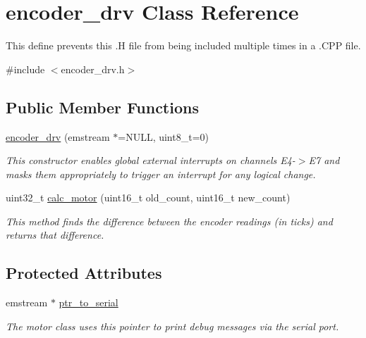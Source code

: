 \hypertarget{classencoder__drv}{\section{encoder\-\_\-drv Class Reference}
\label{classencoder__drv}
}


This define prevents this .H file from being included multiple times in a .C\-P\-P file.  




{\ttfamily \#include $<$encoder\-\_\-drv.\-h$>$}

\subsection*{Public Member Functions}
\begin{DoxyCompactItemize}
\item 
\hyperlink{classencoder__drv_a25af67f4725b47983ceb8ce4edf3296a}{encoder\-\_\-drv} (emstream $\ast$=N\-U\-L\-L, uint8\-\_\-t=0)
\begin{DoxyCompactList}\small\item\em This constructor enables global external interrupts on channels E4-\/$>$E7 and masks them appropriately to trigger an interrupt for any logical change. \end{DoxyCompactList}\item 
uint32\-\_\-t \hyperlink{classencoder__drv_acaf570bdfd03b1852079caaae11721be}{calc\-\_\-motor} (uint16\-\_\-t old\-\_\-count, uint16\-\_\-t new\-\_\-count)
\begin{DoxyCompactList}\small\item\em This method finds the difference between the encoder readings (in ticks) and returns that difference. \end{DoxyCompactList}\end{DoxyCompactItemize}
\subsection*{Protected Attributes}
\begin{DoxyCompactItemize}
\item 
\hypertarget{classencoder__drv_a9efa5138b331c06f0821b087168d2fda}{emstream $\ast$ \hyperlink{classencoder__drv_a9efa5138b331c06f0821b087168d2fda}{ptr\-\_\-to\-\_\-serial}}\label{classencoder__drv_a9efa5138b331c06f0821b087168d2fda}

\begin{DoxyCompactList}\small\item\em The motor class uses this pointer to print debug messages via the serial port. \end{DoxyCompactList}\end{DoxyCompactItemize}


